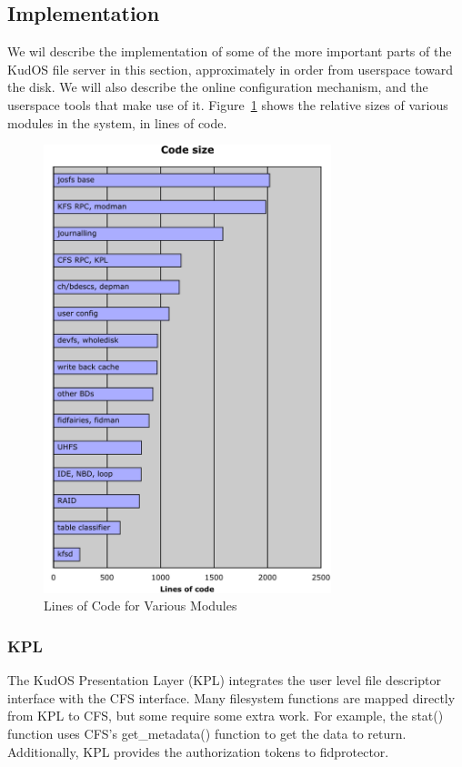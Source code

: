 \subsection{Implementation}
\label{sec:solution:impl}

We wil describe the implementation of some of the more important parts of the
KudOS file server in this section, approximately in order from userspace toward
the disk. We will also describe the online configuration mechanism, and the
userspace tools that make use of it. Figure~\ref{fig:loc} shows the relative
sizes of various modules in the system, in lines of code.

\begin{figure}[htb]
\begin{center}
  \includegraphics[width=8.35cm]{loc_graph}
  \caption{Lines of Code for Various Modules}
  \label{fig:loc}
\end{center}
\end{figure}

\subsubsection{KPL}
\label{sec:solution:impl:kpl}

The KudOS Presentation Layer (KPL) integrates the user level file descriptor
interface with the CFS interface. Many filesystem functions are mapped directly
from KPL to CFS, but some require some extra work. For example, the stat()
function uses CFS's get\_metadata() function to get the data to return.
Additionally, KPL provides the authorization tokens to fidprotector.

